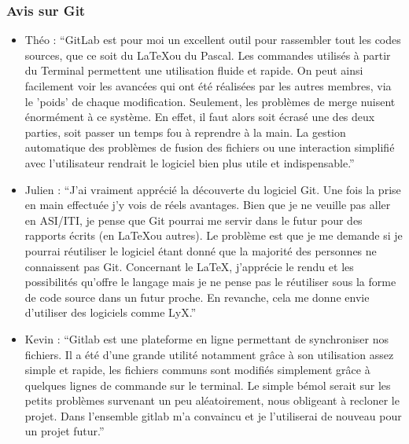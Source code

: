             \subsubsection{Avis sur Git}
                \begin{itemize}
                    \item Théo : \enquote{GitLab est pour moi un excellent outil pour rassembler tout les codes sources, que ce soit du \LaTeX ou du Pascal. Les commandes utilisés à partir du Terminal permettent une utilisation fluide et rapide. On peut ainsi facilement voir les avancées qui ont été réalisées par les autres membres, via le 'poids' de chaque modification. Seulement, les problèmes de merge nuisent énormément à ce système. En effet, il faut alors soit écrasé une des deux parties, soit passer un temps fou à reprendre à la main. La gestion automatique des problèmes de fusion des fichiers ou une interaction simplifié avec l'utilisateur rendrait le logiciel bien plus utile et indispensable.}
        
                    \vspace*{0,4 cm}
        
                    \item Julien : \enquote{J'ai vraiment apprécié la découverte du logiciel Git. Une fois la prise en main effectuée j'y vois de réels avantages. Bien que je ne veuille pas aller en ASI/ITI, je pense que Git pourrai me servir dans le futur pour des rapports écrits (en \LaTeX ou autres). Le problème est que je me demande si je pourrai réutiliser le logiciel étant donné que la majorité des personnes ne connaissent pas Git. Concernant le \LaTeX, j'apprécie le rendu et les possibilités qu'offre le langage mais je ne pense pas le réutiliser sous la forme de code source dans un futur proche. En revanche, cela me donne envie d'utiliser des logiciels comme LyX.}
        
                    \vspace*{0,4 cm}
        
                    \item Kevin : \enquote{Gitlab est une plateforme en ligne permettant de synchroniser nos fichiers. Il a été d'une grande utilité notamment grâce à son utilisation assez simple et rapide, les fichiers communs sont modifiés simplement grâce à quelques lignes de commande sur le terminal. Le simple bémol serait sur les petits problèmes survenant un peu aléatoirement, nous obligeant à recloner le projet. Dans l'ensemble gitlab m'a convaincu et je l'utiliserai de nouveau pour un projet futur.}
        

\end{itemize}
